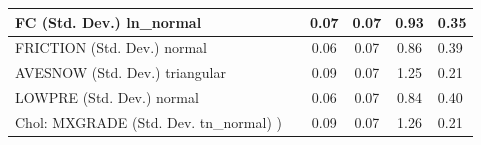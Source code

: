 \begin{table}
\begin{center}
\begin{tabular}{|l|l|c|c|c|l|}
			\hline
			FC (Std. Dev.) ln_normal &  & 0.07 & 0.07 & 0.93 & 0.35 \\
			\hline
			FRICTION (Std. Dev.) normal &  & 0.06 & 0.07 & 0.86 & 0.39 \\
			\hline
			AVESNOW (Std. Dev.) triangular &  & 0.09 & 0.07 & 1.25 & 0.21 \\
			\hline
			LOWPRE (Std. Dev.) normal &  & 0.06 & 0.07 & 0.84 & 0.40 \\
			\hline
			 Chol: MXGRADE (Std. Dev. tn_normal) ) &  & 0.09 & 0.07 & 1.26 & 0.21 \\
			\hline
		\end{tabular}
	\end{center}
\end{table}